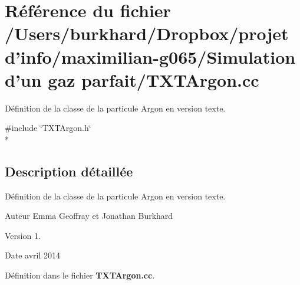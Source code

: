 \section{Référence du fichier /\+Users/burkhard/\+Dropbox/projet d'info/maximilian-\/g065/\+Simulation d'un gaz parfait/\+T\+X\+T\+Argon.cc}
\label{_t_x_t_argon_8cc}


Définition de la classe de la particule Argon en version texte.  


{\ttfamily \#include \char`\"{}T\+X\+T\+Argon.\+h\char`\"{}}\\*


\subsection{Description détaillée}
Définition de la classe de la particule Argon en version texte. 

\begin{DoxyAuthor}{Auteur}
Emma Geoffray et Jonathan Burkhard 
\end{DoxyAuthor}
\begin{DoxyVersion}{Version}
1. 
\end{DoxyVersion}
\begin{DoxyDate}{Date}
avril 2014 
\end{DoxyDate}


Définition dans le fichier {\bf T\+X\+T\+Argon.\+cc}.

